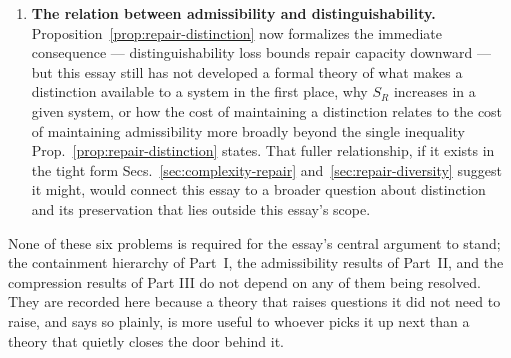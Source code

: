 \documentclass[11pt,a4paper]{article}
\theoremstyle{plain}
\theoremstyle{definition}
\theoremstyle{remark}
\begin{document}
\begin{enumerate}
  \item \textbf{The relation between admissibility and distinguishability.} Proposition~\ref{prop:repair-distinction} now formalizes the immediate consequence — distinguishability loss bounds repair capacity downward — but this essay still has not developed a formal theory of what makes a distinction available to a system in the first place, why $S_R$ increases in a given system, or how the cost of maintaining a distinction relates to the cost of maintaining admissibility more broadly beyond the single inequality Prop.~\ref{prop:repair-distinction} states. That fuller relationship, if it exists in the tight form Secs.~\ref{sec:complexity-repair} and~\ref{sec:repair-diversity} suggest it might, would connect this essay to a broader question about distinction and its preservation that lies outside this essay's scope.
\end{enumerate}

None of these six problems is required for the essay's central argument to stand; the containment hierarchy of Part~I, the admissibility results of Part~II, and the compression results of Part III do not depend on any of them being resolved. They are recorded here because a theory that raises questions it did not need to raise, and says so plainly, is more useful to whoever picks it up next than a theory that quietly closes the door behind it.
\end{document}
